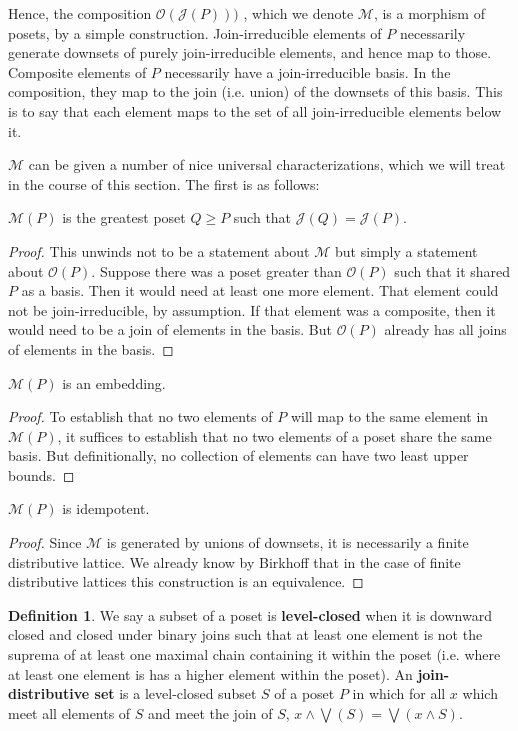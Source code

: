 \documentclass[hoptionsi,review,format=sigplan]{acmart}
\theoremstyle{definition}
\newtheorem{definition}{Definition}[section]
\newcommand{\Mcc}{\mathcal{M}}
\newcommand{\Oc}{\mathcal{O}}
\newcommand{\Jc}{\mathcal{J}}
\begin{document}
Hence, the composition \(\Oc(\Jc(P)))\) , which we denote \(\Mcc\), is a morphism of posets, by a simple construction. Join-irreducible elements of \(P\) necessarily generate downsets of purely join-irreducible elements, and hence map to those. Composite elements of \(P\) necessarily have a join-irreducible basis. In the composition, they map to the join (i.e. union) of the downsets of this basis. This is to say that each element maps to the set of all join-irreducible elements below it. 

\(\Mcc\) can be given a number of nice universal characterizations, which we will treat in the course of this section. The first is as follows:

\begin{lemma}
\(\Mcc(P)\) is the greatest poset \(Q \ge P\) such that \(\Jc(Q) = \Jc(P)\).
\end{lemma}
\begin{proof}
This unwinds not to be a statement about \(\Mcc\) but simply a statement about \(\Oc(P)\).  Suppose there was a poset greater than \(\Oc(P)\) such that it shared \(P\) as a basis. Then it would need at least one more element. That element could not be join-irreducible, by assumption. If that element was a composite, then it would need to be a join of elements in the basis. But \(\Oc(P)\) already has all joins of elements in the basis.
\end{proof}

\begin{lemma}
\(\Mcc(P)\) is an embedding.
\end{lemma}
\begin{proof}
To establish that no two elements of \(P\) will map to the same element in \(\Mcc(P)\), it suffices to establish that no two elements of a poset share the same basis. But definitionally, no collection of elements can have two least upper bounds.
\end{proof}

\begin{lemma}
\(\Mcc(P)\) is idempotent.
\end{lemma}
\begin{proof}
Since \(\Mcc\) is generated by unions of downsets, it is necessarily a finite distributive lattice. We already know by Birkhoff that in the case of finite distributive lattices this construction is an equivalence.
\end{proof}

\begin{definition}
We say a subset of a poset is \textbf{level-closed} when it is downward closed and closed under binary joins such that at least one element is not the suprema of at least one maximal chain containing it within the poset (i.e. where at least one element is has a higher element within the poset). An \textbf{join-distributive set} is a level-closed subset \(S\) of a poset \(P\) in which for all \(x\) which meet all elements of \(S\) and meet the join of \(S\), \(x \wedge \bigvee(S) = \bigvee(x \wedge S)\).
\end{definition}
\end{document}
